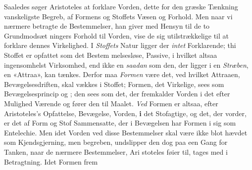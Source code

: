 Saaledes søger Aristoteles at forklare Vorden, dette for
den græske Tænkning vanskeligste Begreb, af Formens og
Stoffets Væsen og Forhold. Men naar vi nærmere betragte de
Bestemmelser, han giver med Hensyn til de to Grundmodsæt\-%
ningers Forhold til Vorden, vise de sig utilstrækkelige til at
forklare dennes Virkelighed. I \emph{Stoffets} Natur ligger der
\emph{intet} Forklarende; thi Stoffet er opfattet som det Bestem\-%
melsesløse, Passive, i hvilket altsaa ingensomhelst Virksomhed,
end ikke en \emph{saadan} som den, der ligger i en \emph{Stræben}, en
«Attraa», kan tænkes. Derfor maa \emph{Formen} være det, ved
hvilket Attraaen, Bevægelsesdriften, skal vækkes i Stoffet;
Formen, det Virkelige, sees som Bevægelsesprincip og ;
den sees som det, der fremkalder Vorden i det efter Mulighed
Værende og fører den til Maalet. \emph{Ved} Formen er altsaa, efter
Aristoteles's Opfattelse, Bevægelse, Vorden, \textbf{i} det Stofagtige,
og det, der vorder, er det af Form og Stof Sammensatte, der
i Bevægelsen har Formen i sig som Entelechie. Men idet
Vorden ved disse Bestemmelser skal være ikke blot hævdet
som Kjendsgjerning, men begreben, undslipper den dog paa
een Gang for Tanken, naar de nærmere Bestemmelser, Ari\-%
stoteles føier til, tages med i Betragtning. Idet Formen frem\-%
